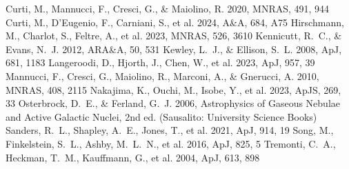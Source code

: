 \documentclass[twocolumn]{aastex631}
\begin{document}
\begin{thebibliography}{}
 Curti, M., Mannucci, F., Cresci, G., \& Maiolino, R. 2020, MNRAS, 491, 944
 Curti, M., D'Eugenio, F., Carniani, S., et al. 2024, A\&A, 684, A75
 Hirschmann, M., Charlot, S., Feltre, A., et al. 2023, MNRAS, 526, 3610
 Kennicutt, R.~C., \& Evans, N.~J. 2012, ARA\&A, 50, 531
 Kewley, L.~J., \& Ellison, S.~L. 2008, ApJ, 681, 1183
 Langeroodi, D., Hjorth, J., Chen, W., et al. 2023, ApJ, 957, 39
 Mannucci, F., Cresci, G., Maiolino, R., Marconi, A., \& Gnerucci, A. 2010, MNRAS, 408, 2115
 Nakajima, K., Ouchi, M., Isobe, Y., et al. 2023, ApJS, 269, 33
 Osterbrock, D.~E., \& Ferland, G.~J. 2006, Astrophysics of Gaseous Nebulae and Active Galactic Nuclei, 2nd ed. (Sausalito: University Science Books)
 Sanders, R.~L., Shapley, A.~E., Jones, T., et al. 2021, ApJ, 914, 19
 Song, M., Finkelstein, S.~L., Ashby, M.~L.~N., et al. 2016, ApJ, 825, 5
 Tremonti, C.~A., Heckman, T.~M., Kauffmann, G., et al. 2004, ApJ, 613, 898
\end{thebibliography}
\end{document}
